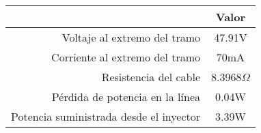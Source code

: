 \begin{tabular}{|r|c|}
  \hline
  \rowcolor[HTML]{E3FFE3} 
  \multicolumn{1}{|c|}{\cellcolor[HTML]{E3FFE3}Parámetro} & Valor \\
  \hline
  Voltaje al extremo del tramo & 47.91V \\
  \hline
  Corriente al extremo del tramo & 70mA \\
  \hline
  Resistencia del cable & 8.3968$ \Omega $ \\
  \hline
  Pérdida de potencia en la línea & 0.04W \\
  \hline
  Potencia suministrada desde el inyector & 3.39W \\
  \hline
\end{tabular}